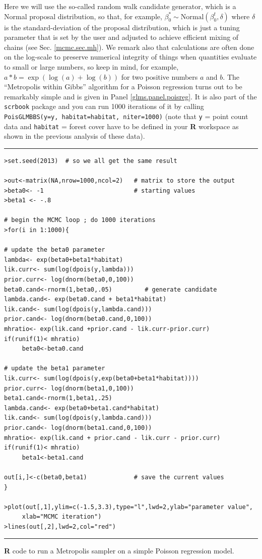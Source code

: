 Here we will
use the so-called random walk candidate generator, which is a Normal proposal distribution, so that, for example,
 $\beta_0^{*} \sim \mbox{Normal}(\beta_0^{t},\delta)$ where $\delta$ is
 the standard-deviation of the proposal distribution, which is just a
 tuning parameter that is set by the user and adjusted to achieve
 efficient mixing of chains (see Sec. \ref{mcmc.sec.mh}).
We remark also that calculations are often done on the log-scale to
preserve numerical integrity of things when quantities evaluate to
small or large numbers, so keep in mind, for example,
$a*b = \exp(\log(a) + \log(b))$ for two positive numbers $a$ and $b$.
 The ``Metropolis within
Gibbs'' algorithm for a Poisson regression turns out to be remarkably
simple and is given in Panel \ref{glms.panel.poisreg}. It is also part
of the {\tt scrbook} package and you can run 1000 iterations of it by
calling {\tt PoisGLMBBS(y=y, habitat=habitat, niter=1000)} (note that
{\tt y} = point count data and {\tt habitat} = forest cover have to
be defined in your {\bf R} workspace as shown in  the previous
analysis of these data).

\begin{panel}[htp]
\centering
\rule[0.15in]{\textwidth}{.03in}
{\small
\begin{verbatim}
>set.seed(2013)  # so we all get the same result

>out<-matrix(NA,nrow=1000,ncol=2)   # matrix to store the output
>beta0<- -1                         # starting values
>beta1 <- -.8

# begin the MCMC loop ; do 1000 iterations
>for(i in 1:1000){

# update the beta0 parameter
lambda<- exp(beta0+beta1*habitat)
lik.curr<- sum(log(dpois(y,lambda)))
prior.curr<- log(dnorm(beta0,0,100))
beta0.cand<-rnorm(1,beta0,.05)         # generate candidate
lambda.cand<- exp(beta0.cand + beta1*habitat)
lik.cand<- sum(log(dpois(y,lambda.cand)))
prior.cand<- log(dnorm(beta0.cand,0,100))
mhratio<- exp(lik.cand +prior.cand - lik.curr-prior.curr)
if(runif(1)< mhratio)
     beta0<-beta0.cand

# update the beta1 parameter
lik.curr<- sum(log(dpois(y,exp(beta0+beta1*habitat))))
prior.curr<- log(dnorm(beta1,0,100))
beta1.cand<-rnorm(1,beta1,.25)
lambda.cand<- exp(beta0+beta1.cand*habitat)
lik.cand<- sum(log(dpois(y,lambda.cand)))
prior.cand<- log(dnorm(beta1.cand,0,100))
mhratio<- exp(lik.cand + prior.cand - lik.curr - prior.curr)
if(runif(1)< mhratio)
     beta1<-beta1.cand

out[i,]<-c(beta0,beta1)             # save the current values
}

>plot(out[,1],ylim=c(-1.5,3.3),type="l",lwd=2,ylab="parameter value",
     xlab="MCMC iteration")
>lines(out[,2],lwd=2,col="red")
\end{verbatim}
}
\rule[-0.15in]{\textwidth}{.03in}
\caption{
{\bf R} code to run a Metropolis sampler on a simple Poisson regression model.
}
\label{glms.panel.poisreg}
\end{panel}

